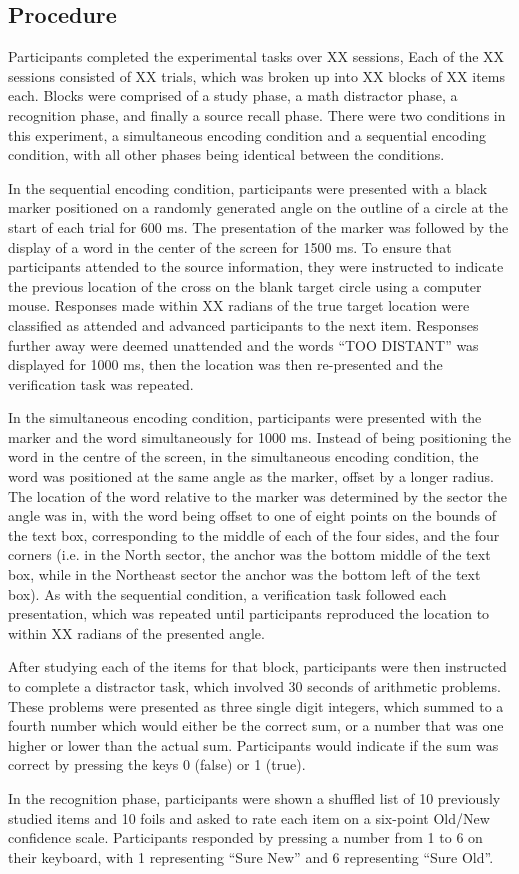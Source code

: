\documentclass[10pt, a4paper, man, biblatex]{apa6}
\begin{document}
\subsection{Procedure}
Participants completed the experimental tasks over XX sessions, Each of the XX sessions consisted of XX trials, which was broken up into XX blocks of XX items each. Blocks were comprised of a study phase, a math distractor phase, a recognition phase, and finally a source recall phase. There were two conditions in this experiment, a simultaneous encoding condition and a sequential encoding condition, with all other phases being identical between the conditions. \par In the sequential encoding condition, participants were presented with a black marker positioned on a randomly generated angle on the outline of a circle at the start of each trial for 600 ms. The presentation of the marker was followed by the display of a word in the center of the screen for 1500 ms. To ensure that participants attended to the source information, they were instructed to indicate the previous location of the cross on the blank target circle using a computer mouse. Responses made within XX radians of the true target location were classified as attended and advanced participants to the next item. Responses further away were deemed unattended and the words “TOO DISTANT” was displayed for 1000 ms, then the location was then re-presented and the verification task was repeated. \par In the simultaneous encoding condition, participants were presented with the marker and the word simultaneously for 1000 ms. Instead of being positioning the word in the centre of the screen, in the simultaneous encoding condition, the word was positioned at the same angle as the marker, offset by a longer radius. The location of the word relative to the marker was determined by the sector the angle was in, with the word being offset to one of eight points on the bounds of the text box, corresponding to the middle of each of the four sides, and the four corners (i.e. in the North sector, the anchor was the bottom middle of the text box, while in the Northeast sector the anchor was the bottom left of the text box). As with the sequential condition, a verification task followed each presentation, which was repeated until participants reproduced the location to within XX radians of the presented angle. \par After studying each of the items for that block, participants were then instructed to complete a distractor task, which involved 30 seconds of arithmetic problems. These problems were presented as three single digit integers, which summed to a fourth number which would either be the correct sum, or a number that was one higher or lower than the actual sum. Participants would indicate if the sum was correct by pressing the keys 0 (false) or 1 (true). \par In the recognition phase, participants were shown a shuffled list of 10 previously studied items and 10 foils and asked to rate each item on a six-point Old/New confidence scale. Participants responded by pressing a number from 1 to 6 on their keyboard, with 1 representing “Sure New” and 6 representing “Sure Old”. 
\end{document}
